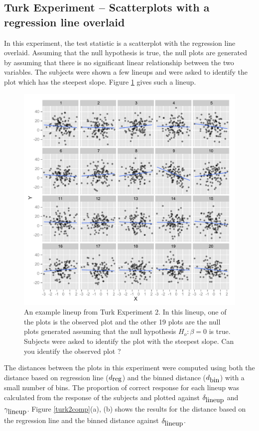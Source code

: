 \documentclass[12]{article}
\begin{document}
\subsection{Turk Experiment -- Scatterplots with a regression line overlaid}

In this experiment, the test statistic is a scatterplot with the regression line overlaid. Assuming that the null hypothesis is true, the null plots are generated by assuming that there is no significant linear relationship between the two variables. The subjects were shown a few lineups and were asked to identify the plot which has the steepest slope. Figure \ref{turk2} gives such a lineup. 

\begin{figure}[htbp]
\centering
\includegraphics[width=.5\textwidth]{turk2-example.pdf}
\caption{An example lineup from Turk Experiment 2. In this lineup, one of the plots is the observed plot and the other 19 plots are the null plots generated assuming that the null hypothesis $H_o : \beta = 0$ is true. Subjects were asked to identify the plot with the steepest slope. Can you identify the observed plot ?}
\label{turk2}
\end{figure}

The distances between the plots in this experiment were computed using both the distance based on regression line ($d_{\hbox{reg}}$) and the binned distance ($d_{\hbox{bin}}$) with a small number of bins. The proportion of correct response for each lineup was calculated from the response of the subjects and plotted against $\delta_{\hbox{lineup}}$ and $\gamma_{\hbox{lineup}}$.  Figure \ref{turk2comp}(a), (b) shows the results for the distance based on the regression line and the binned distance against $\delta_{\hbox{lineup}}$.
\end{document}
